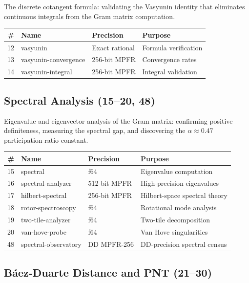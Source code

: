 \documentclass[11pt,a4paper]{article}
\begin{document}
The discrete cotangent formula: validating the Vasyunin identity
that eliminates continuous integrals from the Gram matrix computation.

\begin{center}\small
\begin{tabular}{@{}rllp{5cm}@{}}
\toprule
\textbf{\#} & \textbf{Name} & \textbf{Precision} & \textbf{Purpose} \\
\midrule
12 & vasyunin & Exact rational & Formula verification \\
13 & vasyunin-convergence & 256-bit MPFR & Convergence rates \\
14 & vasyunin-integral & 256-bit MPFR & Integral validation \\
\bottomrule
\end{tabular}
\end{center}

\subsection{Spectral Analysis (15--20, 48)}

Eigenvalue and eigenvector analysis of the Gram matrix: confirming
positive definiteness, measuring the spectral gap, and discovering
the $\alpha \approx 0.47$ participation ratio constant.

\begin{center}\small
\begin{tabular}{@{}rllp{5cm}@{}}
\toprule
\textbf{\#} & \textbf{Name} & \textbf{Precision} & \textbf{Purpose} \\
\midrule
15 & spectral & f64 & Eigenvalue computation \\
16 & spectral-analyzer & 512-bit MPFR & High-precision eigenvalues \\
17 & hilbert-spectral & 256-bit MPFR & Hilbert-space spectral theory \\
18 & rotor-spectroscopy & f64 & Rotational mode analysis \\
19 & two-tile-analyzer & f64 & Two-tile decomposition \\
20 & van-hove-probe & f64 & Van Hove singularities \\
48 & spectral-observatory & DD MPFR-256 & DD-precision spectral census \\
\bottomrule
\end{tabular}
\end{center}

\subsection{B\'aez-Duarte Distance and PNT (21--30)}
\end{document}
